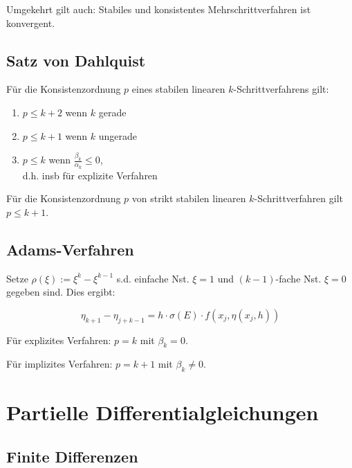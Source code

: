\spacing

Umgekehrt gilt auch: Stabiles und konsistentes Mehrschrittverfahren ist konvergent.

\subsection*{Satz von Dahlquist}

Für die Konsistenzordnung $p$ eines stabilen linearen $k$-Schrittverfahrens gilt:

\begin{enumerate}
\item $p \leq k + 2$ wenn $k$ gerade
\item $p \leq k + 1$ wenn $k$ ungerade
\item $p \leq k$ wenn $\frac{\beta_k}{\alpha_k} \leq 0$,\\ d.h. insb für explizite Verfahren
\end{enumerate}

Für die Konsistenzordnung $p$ von strikt stabilen linearen $k$-Schrittverfahren gilt $p \leq k + 1$.

\subsection*{Adams-Verfahren}

Setze $\rho(\xi) := \xi^k - \xi^{k-1}$ s.d. einfache Nst. $\xi=1$ und $(k-1)$-fache Nst. $\xi = 0$ gegeben sind. Dies ergibt:

\vspace*{-2mm}
$$\eta_{k+1}-\eta_{j+k-1} = h \cdot \sigma(E) \cdot f(x_j,\eta(x_j,h))$$

Für explizites Verfahren: $p = k$ mit $\beta_k = 0$.

Für implizites Verfahren: $p = k+1$ mit $\beta_k \neq 0$.

\section*{Partielle Differentialgleichungen}

\subsection*{Finite Differenzen}
